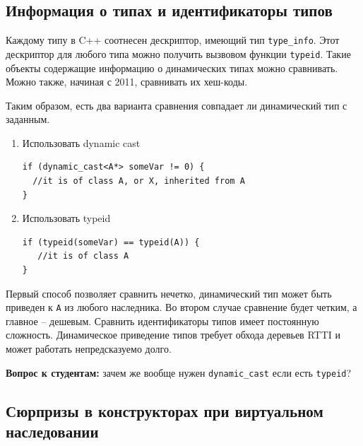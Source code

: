 \documentclass[a4paper,12pt,oneside]{book}
\newif\ifanswers
\begin{document}
\subsection{Информация о типах и идентификаторы типов}\label{TypeInfo}

Каждому типу в C++ соотнесен дескриптор, имеющий тип \lstinline!type_info!. Этот дескриптор для любого типа можно получить вызвовом функции \lstinline!typeid!. Такие объекты содержащие информацию о динамических типах можно сравнивать. Можно также, начиная с 2011, сравнивать их хеш-коды.

Таким образом, есть два варианта сравнения совпадает ли динамический тип с заданным.

\begin{enumerate}

\item Использовать dynamic cast

\begin{lstlisting}
if (dynamic_cast<A*> someVar != 0) { 
  //it is of class A, or X, inherited from A 
}
\end{lstlisting}

\item Использовать typeid

\begin{lstlisting}
if (typeid(someVar) == typeid(A)) {
   //it is of class A
}
\end{lstlisting}

\end{enumerate}

Первый способ позволяет сравнить нечетко, динамический тип может быть приведен к \lstinline!A! из любого наследника. Во втором случае сравнение будет четким, а главное -- дешевым. Сравнить идентификаторы типов имеет постоянную сложность. Динамическое приведение типов требует обхода деревьев RTTI и может работать непредсказуемо долго.

\textbf{Вопрос к студентам:} зачем же вообще нужен \lstinline!dynamic_cast! если есть \lstinline!typeid!?

\ifanswers
Правильный ответ: в первую очередь из-за сложностей приведения в связке \lstinline!typeid! + \lstinline!static_cast! (см. выше разговор о том почему в иерархиях множественного наследования нам вообще не хватает статического приведения).
\fi

\subsection{Сюрпризы в конструкторах при виртуальном наследовании}\label{VirtualBaseClassConstr}
\end{document}
